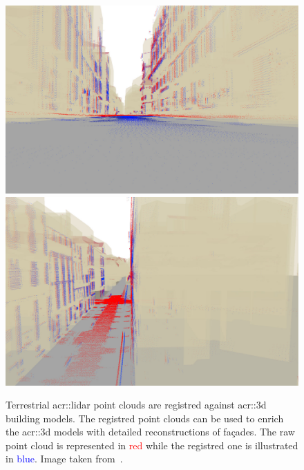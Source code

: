             \begin{figure}[htb]
                \centering
                \includegraphics[width=.45\textwidth]{images/introduction/registration_1}
                \includegraphics[width=.45\textwidth]{images/introduction/registration_2}
                \caption[
                    Terrestrial \acrshort*{acr::lidar} point clouds are registred against building \acrshort*{acr::3d} models.
                ]{
                    \label{fig::3d_model_terrestrial_registration}
                    Terrestrial \gls{acr::lidar} point clouds are registred against \gls{acr::3d} building models.
                    The registred point clouds can be used to enrich the \gls{acr::3d} models with detailed reconstructions of fa\c{c}ades.
                    The raw point cloud is represented in \textcolor{Red}{red} while the registred one is illustrated in \textcolor{Blue}{blue}.
                    Image taken from~\parencite{monnier2014}.
                }
            \end{figure}

